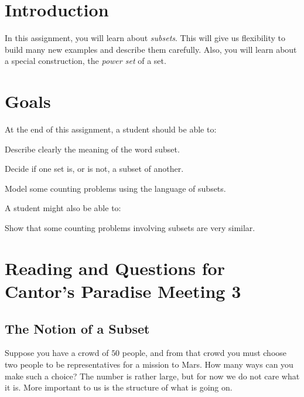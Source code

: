 \documentclass[12pt,letterpaper]{article}
\theoremstyle{definition}
\begin{document}
\setlength{\parskip}{1ex plus 0.5ex minus 0.2ex}
\setlength{\parindent}{0pt}

\pagestyle{fancy}
\cfoot{}

\section*{Introduction}
In this assignment, you will learn about \emph{subsets}. This will give us flexibility to build many new examples and describe them carefully. Also, you will learn about a special  construction, the \emph{power set} of a set.

\section*{Goals}
At the end of this assignment, a student should be able to:
\begin{compactitem}
\item Describe clearly the meaning of the word subset.
\item Decide if one set is, or is not, a subset of another.
\item Model some counting problems using the language of subsets.
\end{compactitem}
A student might also be able to:
\begin{compactitem}
\item Show that some counting problems involving subsets are very similar.
\end{compactitem}

\section*{Reading and Questions for Cantor's Paradise Meeting 3}

\subsection*{The Notion of a Subset}
Suppose you have a crowd of $50$ people, and from that crowd you must choose two people to be representatives for a mission to Mars. 
How many ways can you make such a choice? 
The number is rather large, but for now we do not care what it is. 
More important to us is the structure of what is going on.
\end{document}

